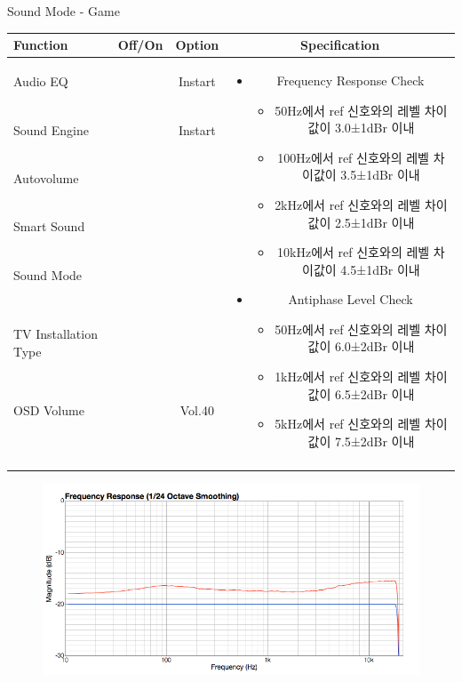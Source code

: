 \begin{frame}[t]{Sound Mode - Game}
\begin{tiny}
\begin{tabular}{@{}lccc@{}}
\toprule
Function & Off/On & Option & Specification \\
\midrule
Audio EQ & \color{black}{Off} & Instart &
\multirow{10}{60mm}{
\begin{itemize}
\item Frequency Response Check
	\begin{itemize}
	\item 50Hz에서 ref 신호와의 레벨 차이값이 3.0±1dBr 이내
	\item 100Hz에서 ref 신호와의 레벨 차이값이 3.5±1dBr 이내
	\item 2kHz에서 ref 신호와의 레벨 차이값이 2.5±1dBr 이내
	\item 10kHz에서 ref 신호와의 레벨 차이값이 4.5±1dBr 이내
	\end{itemize}
\item Antiphase Level Check
	\begin{itemize}
	\item 50Hz에서 ref 신호와의 레벨 차이값이 6.0±2dBr 이내
	\item 1kHz에서 ref 신호와의 레벨 차이값이 6.5±2dBr 이내
	\item 5kHz에서 ref 신호와의 레벨 차이값이 7.5±2dBr 이내
	\end{itemize}
\end{itemize}
} \\
Sound Engine & \color{blue}{On} & Instart & \\
Autovolume & \color{black}{Off} & & \\
Smart Sound & \color{black}{Off} & & \\
Sound Mode & \color{blue}{On} & \color{blue}{Game} & \\
TV Installation Type & \color{blue}{On} & \color{black}{Standtype1} & \\
OSD Volume & \color{blue}{On} & Vol.40 & \\
& & & \\
& & & \\
& & & \\
& & & \\
\midrule
\end{tabular}
\end{tiny}

\begin{figure}[b]
\includegraphics[height=0.3\textwidth]{figures/game.png}
\end{figure}

\end{frame}

